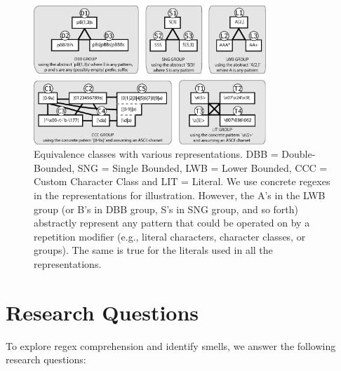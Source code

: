 



\begin{figure}[tb]
\centering
\includegraphics[width=0.78\textwidth]{illustrations/refactoringTree.eps}
\vspace{-6pt}
\caption{Equivalence classes with various representations. DBB = Double-Bounded, SNG = Single Bounded, LWB = Lower Bounded, CCC = Custom Character Class and LIT = Literal. We use concrete regexes in the representations for illustration. However, the A's in the LWB group (or B's in DBB group, S's in SNG group, and so forth) abstractly represent any pattern that could be operated on by a repetition modifier (e.g., literal characters, character classes, or groups). The same is true for the literals used in all the representations. }
\vspace{-6pt}
\label{fig:refactoringTree}
\end{figure}


\section{Research Questions}
\label{sec:study}

To explore regex comprehension and identify smells, we answer the following research questions: \\


